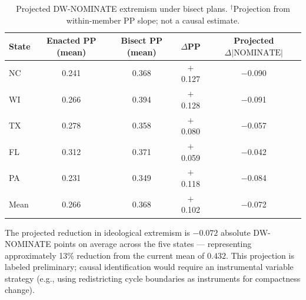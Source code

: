 \begin{table}[h]
\centering\small
\caption{Projected DW-NOMINATE extremism under bisect plans.
${}^\dagger$Projection from within-member PP slope; not a causal estimate.}
\label{tab:nominate-projection}
\begin{tabular}{lcccc}
\toprule
State & Enacted PP (mean) & Bisect PP (mean) & $\Delta$PP & Projected $\Delta|\text{NOMINATE}|$ \\
\midrule
NC & 0.241 & 0.368 & $+$0.127 & $-$0.090 \\
WI & 0.266 & 0.394 & $+$0.128 & $-$0.091 \\
TX & 0.278 & 0.358 & $+$0.080 & $-$0.057 \\
FL & 0.312 & 0.371 & $+$0.059 & $-$0.042 \\
PA & 0.231 & 0.349 & $+$0.118 & $-$0.084 \\
\midrule
Mean & 0.266 & 0.368 & $+$0.102 & $-$0.072 \\
\bottomrule
\end{tabular}
\end{table}

The projected reduction in ideological extremism is $-0.072$ absolute
DW-NOMINATE points on average across the five states --- representing
approximately 13\% reduction from the current mean of $0.432$.
This projection is labeled preliminary; causal identification would require
an instrumental variable strategy (e.g., using redistricting cycle boundaries
as instruments for compactness change).
